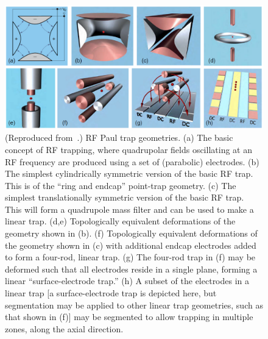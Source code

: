 \documentclass[%
12pt,
 amsmath,amssymb,
]{revtex4-2}
\begin{document}
\begin{figure}[tp]
\includegraphics[width=0.9\columnwidth]{traps_from_brownnutt.PNG}
\caption{(Reproduced from~\cite{brownnutt_2015}.) RF Paul trap geometries. (a) The basic concept of RF trapping, where quadrupolar fields oscillating at an RF frequency are produced using a set of (parabolic) electrodes.  (b) The simplest cylindrically symmetric version of the basic RF trap.  This is of the ``ring and endcap'' point-trap geometry.  (c) The simplest translationally symmetric version of the basic RF trap.  This will form a quadrupole mass filter and can be used to make a linear trap.  (d,e) Topologically equivalent deformations of the geometry shown in (b).  (f) Topologically equivalent deformations of the geometry shown in (c) with additional endcap electrodes added to form a four-rod, linear trap.  (g) The four-rod trap in (f) may be deformed such that all electrodes reside in a single plane, forming a linear ``surface-electrode trap.''  (h) A subset of the electrodes in a linear trap [a surface-electrode trap is depicted here, but segmentation may be applied to other linear trap geometries, such as that shown in (f)] may be segmented to allow trapping in multiple zones, along the axial direction.}
\label{fig:rf_trap_types}
\end{figure}
\end{document}
